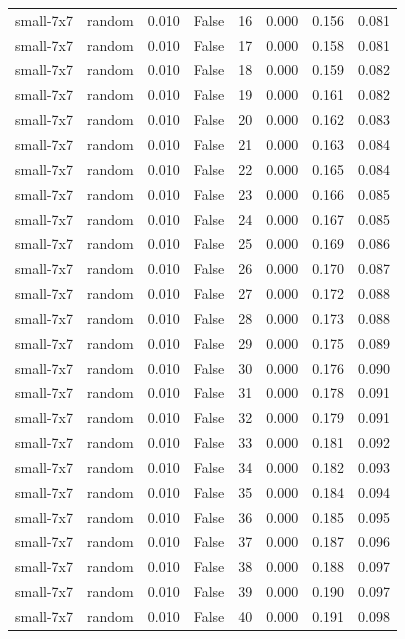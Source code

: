 \begin{tabular}{llrrrrrr}
small-7x7 & random & 0.010 & False & 16 & 0.000 & 0.156 & 0.081 \\
small-7x7 & random & 0.010 & False & 17 & 0.000 & 0.158 & 0.081 \\
small-7x7 & random & 0.010 & False & 18 & 0.000 & 0.159 & 0.082 \\
small-7x7 & random & 0.010 & False & 19 & 0.000 & 0.161 & 0.082 \\
small-7x7 & random & 0.010 & False & 20 & 0.000 & 0.162 & 0.083 \\
small-7x7 & random & 0.010 & False & 21 & 0.000 & 0.163 & 0.084 \\
small-7x7 & random & 0.010 & False & 22 & 0.000 & 0.165 & 0.084 \\
small-7x7 & random & 0.010 & False & 23 & 0.000 & 0.166 & 0.085 \\
small-7x7 & random & 0.010 & False & 24 & 0.000 & 0.167 & 0.085 \\
small-7x7 & random & 0.010 & False & 25 & 0.000 & 0.169 & 0.086 \\
small-7x7 & random & 0.010 & False & 26 & 0.000 & 0.170 & 0.087 \\
small-7x7 & random & 0.010 & False & 27 & 0.000 & 0.172 & 0.088 \\
small-7x7 & random & 0.010 & False & 28 & 0.000 & 0.173 & 0.088 \\
small-7x7 & random & 0.010 & False & 29 & 0.000 & 0.175 & 0.089 \\
small-7x7 & random & 0.010 & False & 30 & 0.000 & 0.176 & 0.090 \\
small-7x7 & random & 0.010 & False & 31 & 0.000 & 0.178 & 0.091 \\
small-7x7 & random & 0.010 & False & 32 & 0.000 & 0.179 & 0.091 \\
small-7x7 & random & 0.010 & False & 33 & 0.000 & 0.181 & 0.092 \\
small-7x7 & random & 0.010 & False & 34 & 0.000 & 0.182 & 0.093 \\
small-7x7 & random & 0.010 & False & 35 & 0.000 & 0.184 & 0.094 \\
small-7x7 & random & 0.010 & False & 36 & 0.000 & 0.185 & 0.095 \\
small-7x7 & random & 0.010 & False & 37 & 0.000 & 0.187 & 0.096 \\
small-7x7 & random & 0.010 & False & 38 & 0.000 & 0.188 & 0.097 \\
small-7x7 & random & 0.010 & False & 39 & 0.000 & 0.190 & 0.097 \\
small-7x7 & random & 0.010 & False & 40 & 0.000 & 0.191 & 0.098 \\

\end{tabular}
